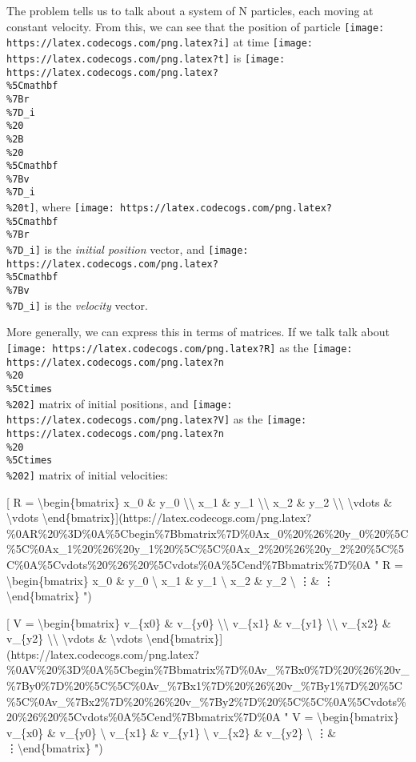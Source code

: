 \documentclass[]{article}
\begin{document}
The problem tells us to talk about a system of N particles, each moving at
constant velocity. From this, we can see that the position of particle
\texttt{[image: https://latex.codecogs.com/png.latex?i]} at time
\texttt{[image: https://latex.codecogs.com/png.latex?t]} is
\texttt{[image: https://latex.codecogs.com/png.latex?\\\%5Cmathbf\\\%7Br\\\%7D\_i\\\%20\\\%2B\\\%20\\\%5Cmathbf\\\%7Bv\\\%7D\_i\\\%20t]},
where
\texttt{[image: https://latex.codecogs.com/png.latex?\\\%5Cmathbf\\\%7Br\\\%7D\_i]} is
the \emph{initial position} vector, and
\texttt{[image: https://latex.codecogs.com/png.latex?\\\%5Cmathbf\\\%7Bv\\\%7D\_i]} is
the \emph{velocity} vector.

More generally, we can express this in terms of matrices. If we talk talk about
\texttt{[image: https://latex.codecogs.com/png.latex?R]} as the
\texttt{[image: https://latex.codecogs.com/png.latex?n\\\%20\\\%5Ctimes\\\%202]}
matrix of initial positions, and
\texttt{[image: https://latex.codecogs.com/png.latex?V]} as the
\texttt{[image: https://latex.codecogs.com/png.latex?n\\\%20\\\%5Ctimes\\\%202]}
matrix of initial velocities:

{[} R = \textbackslash{}begin\{bmatrix\} x\_0 \& y\_0
\textbackslash{}\textbackslash{} x\_1 \& y\_1 \textbackslash{}\textbackslash{}
x\_2 \& y\_2 \textbackslash{}\textbackslash{} \textbackslash{}vdots \&
\textbackslash{}vdots
\textbackslash{}end\{bmatrix\}{]}(https://latex.codecogs.com/png.latex?\%0AR\%20\%3D\%0A\%5Cbegin\%7Bbmatrix\%7D\%0Ax\_0\%20\%26\%20y\_0\%20\%5C\%5C\%0Ax\_1\%20\%26\%20y\_1\%20\%5C\%5C\%0Ax\_2\%20\%26\%20y\_2\%20\%5C\%5C\%0A\%5Cvdots\%20\%26\%20\%5Cvdots\%0A\%5Cend\%7Bbmatrix\%7D\%0A
" R = \textbackslash{}begin\{bmatrix\} x\_0 \& y\_0 \textbackslash{} x\_1 \&
y\_1 \textbackslash{} x\_2 \& y\_2 \textbackslash{} \vdots \& \vdots
\textbackslash{}end\{bmatrix\} ")

{[} V = \textbackslash{}begin\{bmatrix\} v\_\{x0\} \& v\_\{y0\}
\textbackslash{}\textbackslash{} v\_\{x1\} \& v\_\{y1\}
\textbackslash{}\textbackslash{} v\_\{x2\} \& v\_\{y2\}
\textbackslash{}\textbackslash{} \textbackslash{}vdots \& \textbackslash{}vdots
\textbackslash{}end\{bmatrix\}{]}(https://latex.codecogs.com/png.latex?\%0AV\%20\%3D\%0A\%5Cbegin\%7Bbmatrix\%7D\%0Av\_\%7Bx0\%7D\%20\%26\%20v\_\%7By0\%7D\%20\%5C\%5C\%0Av\_\%7Bx1\%7D\%20\%26\%20v\_\%7By1\%7D\%20\%5C\%5C\%0Av\_\%7Bx2\%7D\%20\%26\%20v\_\%7By2\%7D\%20\%5C\%5C\%0A\%5Cvdots\%20\%26\%20\%5Cvdots\%0A\%5Cend\%7Bbmatrix\%7D\%0A
" V = \textbackslash{}begin\{bmatrix\} v\_\{x0\} \& v\_\{y0\} \textbackslash{}
v\_\{x1\} \& v\_\{y1\} \textbackslash{} v\_\{x2\} \& v\_\{y2\} \textbackslash{}
\vdots \& \vdots \textbackslash{}end\{bmatrix\} ")
\end{document}
